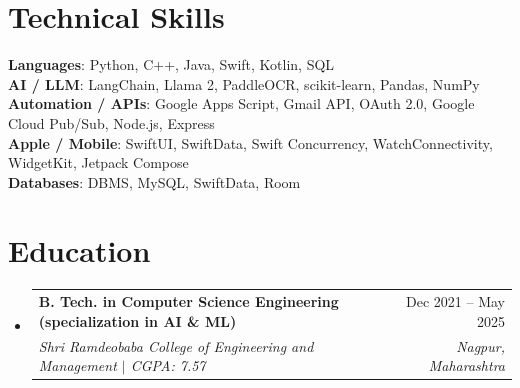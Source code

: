 \documentclass[a4paper,11pt]{article}
\makeatletter
\newcommand{\resumeSubheading}[4]{
  \vspace{-1pt}\item
    \begin{tabularx}{0.97\textwidth}[t]{@{}>{\raggedright\arraybackslash}X@{\hspace{0.75em}}r@{}}
      \textbf{#1} & #2 \\
      \textit{\small#3} & \textit{\small #4} \\
    \end{tabularx}\vspace{-3pt}
}
\newcommand{\resumeSubItemListStart}{\begin{itemize}[leftmargin=0.15in, label={}]}
\newcommand{\resumeSubItemListEnd}{\end{itemize}}
\makeatother
\begin{document}
\section{Technical Skills}
  \begin{itemize}[leftmargin=0.15in, label={}]
    \small{\item{
      \textbf{Languages}{: Python, C++, Java, Swift, Kotlin, SQL} \\
      \textbf{AI / LLM}{: LangChain, Llama 2, PaddleOCR, scikit-learn, Pandas, NumPy} \\
      \textbf{Automation / APIs}{: Google Apps Script, Gmail API, OAuth 2.0, Google Cloud Pub/Sub, Node.js, Express} \\
      \textbf{Apple / Mobile}{: SwiftUI, SwiftData, Swift Concurrency, WatchConnectivity, WidgetKit, Jetpack Compose} \\
      \textbf{Databases}{: DBMS, MySQL, SwiftData, Room}
    }}
  \end{itemize}

\section{Education}
  \resumeSubItemListStart
    \resumeSubheading
      {B. Tech. in Computer Science Engineering (specialization in AI \& ML)}{Dec 2021 -- May 2025}
      {Shri Ramdeobaba College of Engineering and Management $|$ CGPA: 7.57}{Nagpur, Maharashtra}
  \resumeSubItemListEnd
\end{document}
